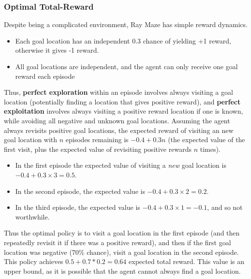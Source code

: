 \documentclass{article}
\begin{document}
\subsubsection{Optimal Total-Reward}
Despite being a complicated environment, Ray Maze has simple reward dynamics.
\begin{itemize}
    \item Each goal location has an independent 0.3 chance of yielding +1 reward, otherwise it gives -1 reward.
    \item All goal locations are independent, and the agent can only receive one goal reward each episode
\end{itemize}
Thus, \textbf{perfect exploration} within an episode involves always visiting a goal location (potentially finding a location that gives positive reward), and \textbf{perfect exploitation} involves always visiting a positive reward location if one is known, while avoiding all negative and unknown goal locations.
Assuming the agent always revisits positive goal locations, the expected reward of visiting an new goal location with \(n\) episodes remaining is \(-0.4 + 0.3n\) (the expected value of the first visit, plus the expected value of revisiting positive rewards \(n\) times).
\begin{itemize}
    \item In the first episode the expected value of visiting a \emph{new} goal location is \(-0.4 + 0.3 \times 3 = 0.5\).
    \item In the second episode, the expected value is \(-0.4 + 0.3 \times 2 = 0.2\).
    \item In the third episode, the expected value is \(-0.4 + 0.3 \times 1 = -0.1\), and so not worthwhile.
\end{itemize}
Thus the optimal policy is to visit a goal location in the first episode (and then repeatedly revisit it if there was a positive reward), and then if the first goal location was negative (70\% chance), visit a goal location in the second episode.
This policy achieves \(0.5 + 0.7 * 0.2 = 0.64\) expected total reward. This value is an upper bound, as it is possible that the agent cannot always find a goal location.
\vfill
\pagebreak
\end{document}
